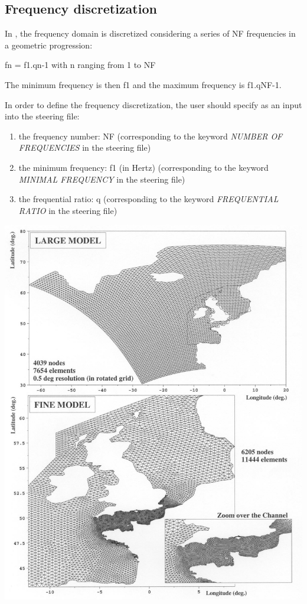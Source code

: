 \subsection{ Frequency discretization}

 In \tomawac, the frequency domain is discretized considering a series of NF frequencies in a geometric progression:

   fn = f1.qn-1  with n ranging from 1 to NF

 The minimum frequency is then f1 and the maximum frequency is f1.qNF-1.

In order to define the frequency discretization, the user should specify as an input into the steering file:

\begin{enumerate}
\item  the frequency number: NF (corresponding to the keyword \textit{NUMBER OF FREQUENCIES} in the steering file)

\item  the minimum frequency: f1 (in Hertz) (corresponding to the keyword \textit{MINIMAL FREQUENCY} in the steering file)

\item  the frequential ratio: q (corresponding to the keyword \textit{FREQUENTIAL RATIO} in the steering file)
\end{enumerate}

  \includegraphics*[width=5.72in ]{graphics/mailocean.jpg}

